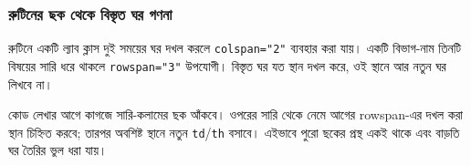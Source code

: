 \subsubsection{রুটিনের ছক থেকে বিস্তৃত ঘর গণনা}
রুটিনে একটি ল্যাব ক্লাস দুই সময়ের ঘর দখল করলে \texttt{colspan="2"} ব্যবহার করা যায়। একটি বিভাগ-নাম তিনটি বিষয়ের সারি ধরে থাকলে \texttt{rowspan="3"} উপযোগী। বিস্তৃত ঘর যত স্থান দখল করে, ওই স্থানে আর নতুন ঘর লিখবে না।

কোড লেখার আগে কাগজে সারি-কলামের ছক আঁকবে। ওপরের সারি থেকে নেমে আগের rowspan-এর দখল করা স্থান চিহ্নিত করবে; তারপর অবশিষ্ট স্থানে নতুন \texttt{td}/\texttt{th} বসাবে। এইভাবে পুরো ছকের প্রস্থ একই থাকে এবং বাড়তি ঘর তৈরির ভুল ধরা যায়।
